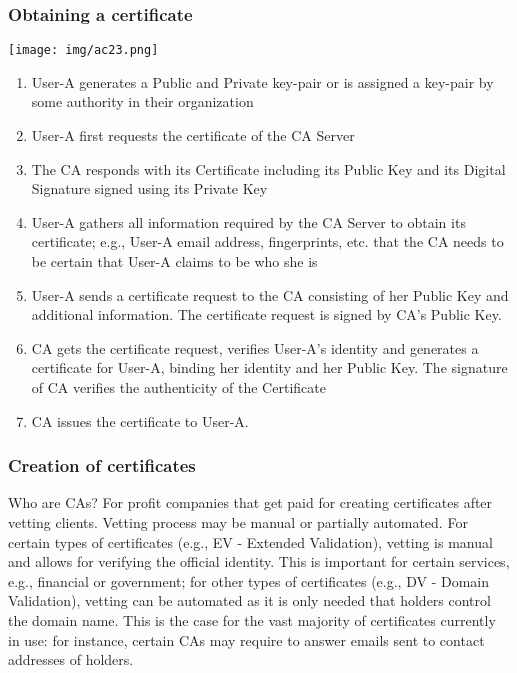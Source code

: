 \documentclass[a4paper, 10pt, titlepage]{article}
\begin{document}
\subsubsection{Obtaining a certificate}

\begin{center}
\texttt{[image: img/ac23.png]}
\end{center}

\begin{enumerate}
\item User-A generates a Public and Private key-pair or is assigned a key-pair by some authority in their organization
\item User-A first requests the certificate of the CA Server
\item The CA responds with its Certificate including its Public Key and its Digital Signature signed using its Private Key
\item User-A gathers all information required by the CA Server to obtain its certificate; e.g., User-A email address, fingerprints, etc. that the CA needs to be certain that User-A claims to be who she is
\item User-A sends a certificate request to the CA consisting of her Public Key and additional information. The certificate request is signed by CA's Public Key.
\item CA gets the certificate request, verifies User-A's identity and generates a certificate for User-A, binding her identity and her Public Key. The signature of CA verifies the authenticity of the Certificate 
\item CA issues the certificate to User-A.
\end{enumerate}

\subsubsection{Creation of certificates}
Who are CAs? For profit companies that get paid for creating certificates after vetting clients. Vetting process may be manual or partially automated. For certain types of certificates (e.g., EV - Extended Validation), vetting is manual and allows for verifying the official identity. This is important for certain services, e.g., financial or government; for other types of certificates (e.g., DV - Domain Validation), vetting can be automated as it is only needed that holders control the domain name. This is the case for the vast majority of certificates currently in use: for instance, certain CAs may require to answer emails sent to contact addresses of holders.
\end{document}
